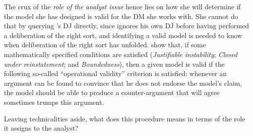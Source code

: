 \documentclass[a4paper, 11pt]{article}
\begin{document}
The crux of the \emph{role of the analyst issue} hence lies on how she will determine if the model she has designed is valid for the \ac{DM} she works with. She cannot do that by querying \thedm’s \ac{DJ} directly, since \thedm{} ignores his own \ac{DJ} before having performed a deliberation of the right sort, and identifying a valid model is needed to know when deliberation of the right sort has unfolded. \citet{cailloux_formal_2019} show that, if some mathematically specified conditions are satisfied (\emph{Justifiable instability}; \emph{Closed under reinstatement}; and \emph{Boundedness}), then  a given model is valid  if the following so-called “operational validity” criterion is satisfied: whenever an argument can be found to convince \thedm{} that he does not endorse the model’s claim, the model should be able to produce a counter-argument that \thedm{} will agree sometimes trumps this argument.

Leaving technicalities aside, what does this procedure means in terms of the role it assigns to the analyst?
\end{document}
